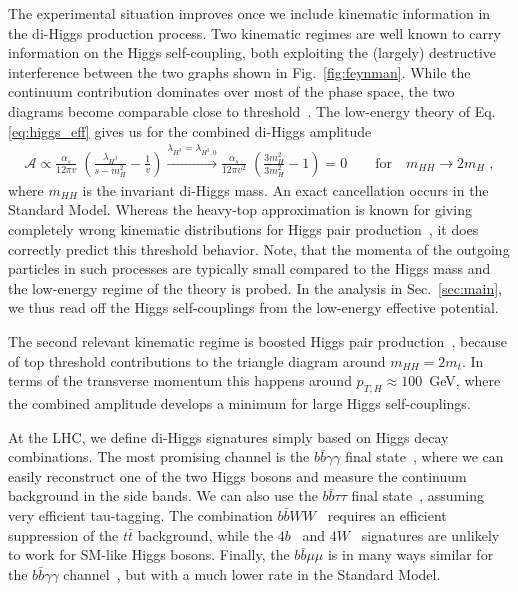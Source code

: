 \documentclass[aps,prd,11pt,tightenlines,superscriptaddress,nofootinbib,preprintnumbers,notitlepage]{revtex4-1}
\begin{document}
The experimental situation improves once we include kinematic
information in the di-Higgs production process.  Two kinematic regimes
are well known to carry information on the Higgs self-coupling, both
exploiting the (largely) destructive interference between the two
graphs shown in Fig.~\ref{fig:feynman}. While the continuum
contribution dominates over most of the phase space, the two diagrams
become comparable close to threshold~\cite{spirix,uli1}. The
low-energy theory of Eq.\eqref{eq:higgs_eff} gives us for the combined
di-Higgs amplitude
%
\begin{align}
\mathcal{A} \propto 
\frac{\alpha_s}{12 \pi v} \; 
\left( \frac{\lambda_{H^3}}{s-m_H^2} - \frac{1}{v} \right) 
\stackrel{\lambda_{H^3} = \lambda_{H^3,0}}{\longrightarrow}
\frac{\alpha_s}{12 \pi v^2} \; 
\left( \frac{3m_H^2}{3m_H^2} -1 \right) = 0 
\qquad \text{for} \quad 
m_{HH} \to 2 m_H \; ,
\label{eq:higgs_pair}
\end{align}
%
where $m_{HH}$ is the invariant di-Higgs mass.  An exact cancellation
occurs in the Standard Model.  Whereas the heavy-top approximation is
known for giving completely wrong kinematic distributions for Higgs
pair production~\cite{uli1}, it does correctly predict this threshold
behavior. Note, that the momenta of the outgoing particles in such processes are 
typically small compared to the Higgs mass and the low-energy regime of 
the theory is probed. In the analysis in Sec.~\ref{sec:main}, we thus read off 
the Higgs self-couplings from the low-energy effective potential.


The second relevant kinematic regime is boosted Higgs pair
production~\cite{boosted}, because of top threshold contributions to
the triangle diagram around $m_{HH} = 2 m_t$. In terms of the
transverse momentum this happens around $p_{T,H} \approx 100$~GeV,
where the combined amplitude develops a minimum for large Higgs
self-couplings.\medskip

At the LHC, we define di-Higgs signatures simply based on Higgs decay
combinations. The most promising channel is the $b\bar{b}\gamma\gamma$
final state~\cite{uli3,madmax,vernon,atlas}, where we can easily
reconstruct one of the two Higgs bosons and measure the continuum
background in the side bands.  We can also use the $b\bar{b} \tau
\tau$ final state~\cite{uli2,boosted}, assuming very efficient
tau-tagging.  The combination $b\bar{b}WW$~\cite{bbww} requires an
efficient suppression of the $t\bar{t}$ background, while the
$4b$~\cite{uli2,bbbb} and $4W$~\cite{uli1,wwww} signatures are
unlikely to work for SM-like Higgs bosons. Finally, the $b\bar{b} \mu
\mu$ is in many ways similar for the $b\bar{b} \gamma \gamma$
channel~\cite{uli3}, but with a much lower rate in the Standard Model.
\end{document}
